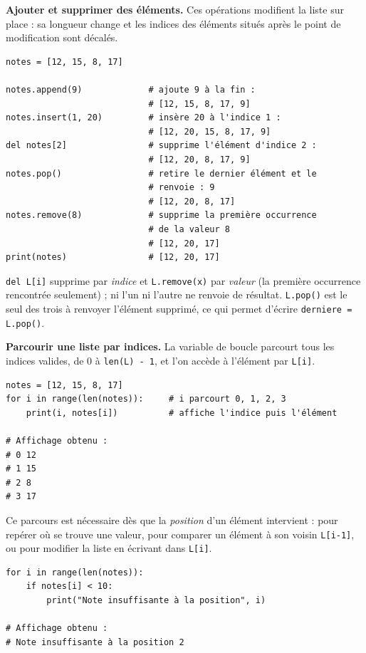 \textbf{Ajouter et supprimer des éléments.}
Ces opérations modifient la liste sur place : sa longueur change et les
indices des éléments situés après le point de modification sont décalés.

\begin{verbatim}
notes = [12, 15, 8, 17]

notes.append(9)             # ajoute 9 à la fin :
                            # [12, 15, 8, 17, 9]
notes.insert(1, 20)         # insère 20 à l'indice 1 :
                            # [12, 20, 15, 8, 17, 9]
del notes[2]                # supprime l'élément d'indice 2 :
                            # [12, 20, 8, 17, 9]
notes.pop()                 # retire le dernier élément et le
                            # renvoie : 9
                            # [12, 20, 8, 17]
notes.remove(8)             # supprime la première occurrence
                            # de la valeur 8
                            # [12, 20, 17]
print(notes)                # [12, 20, 17]
\end{verbatim}

\verb|del L[i]| supprime par \emph{indice} et \verb|L.remove(x)| par
\emph{valeur} (la première occurrence rencontrée seulement) ; ni l'un ni
l'autre ne renvoie de résultat. \verb|L.pop()| est le seul des trois à
renvoyer l'élément supprimé, ce qui permet d'écrire
\verb|derniere = L.pop()|.

\textbf{Parcourir une liste par indices.}
La variable de boucle parcourt tous les indices valides, de 0 à
\verb|len(L) - 1|, et l'on accède à l'élément par \verb|L[i]|.

\begin{verbatim}
notes = [12, 15, 8, 17]
for i in range(len(notes)):     # i parcourt 0, 1, 2, 3
    print(i, notes[i])          # affiche l'indice puis l'élément

# Affichage obtenu :
# 0 12
# 1 15
# 2 8
# 3 17
\end{verbatim}

Ce parcours est nécessaire dès que la \emph{position} d'un élément intervient :
pour repérer où se trouve une valeur, pour comparer un élément à son voisin
\verb|L[i-1]|, ou pour modifier la liste en écrivant dans \verb|L[i]|.

\begin{verbatim}
for i in range(len(notes)):
    if notes[i] < 10:
        print("Note insuffisante à la position", i)

# Affichage obtenu :
# Note insuffisante à la position 2
\end{verbatim}

